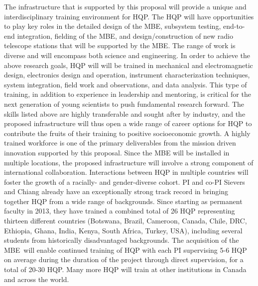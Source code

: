 \documentclass[11pt]{article}
\newcommand{\mbe}{{\rm MBE}}
\begin{document}
The infrastructure that is supported by this proposal will provide a
unique and interdisciplinary training environment for HQP.  The HQP
will have opportunities to play key roles in the detailed design of
the \mbe, subsystem testing, end-to-end integration, fielding of the
\mbe, and design/construction of new radio telescope stations that
will be supported by the \mbe.  The range of work is diverse and will
encompass both science and engineering.  In order to achieve the above
research goals, HQP will will be trained in mechanical and
electromagnetic design, electronics design and operation, instrument
characterization techniques, system integration, field work and
observations, and data analysis.  This type of training, in addition
to experience in leadership and mentoring, is critical for the next
generation of young scientists to push fundamental research forward.
The skills listed above are highly transferable and sought after by
industry, and the proposed infrastructure will thus open a wide range
of career options for HQP to contribute the fruits of their training
to positive socioeconomic growth.  A highly trained workforce is one
of the primary deliverables from the mission driven innovation
supported by this proposal.  Since the MBE will be installed in
multiple locations, the proposed infrastructure will involve a strong
component of international collaboration.  Interactions between HQP in
multiple countries will foster the growth of a racially- and
gender-diverse cohort.  PI and co-PI Sievers and Chiang already have
an exceptionally strong track record in bringing together HQP from a
wide range of backgrounds.  Since starting as permanent faculty in
2013, they have trained a combined total of 26 HQP representing thirteen
different countries (Botswana, Brazil, Cameroon, Canada, Chile, DRC, Ethiopia, Ghana, India,
Kenya, South Africa, Turkey, USA), including several students
from historically disadvantaged backgrounds.  The acquisition of the
\mbe\ will enable continued training of HQP with each PI supervising
5-6 HQP on average during the duration of the project through direct
supervision, for a total of 20-30 HQP.  Many more HQP will train at
other institutions in Canada and across the world.
\end{document}
